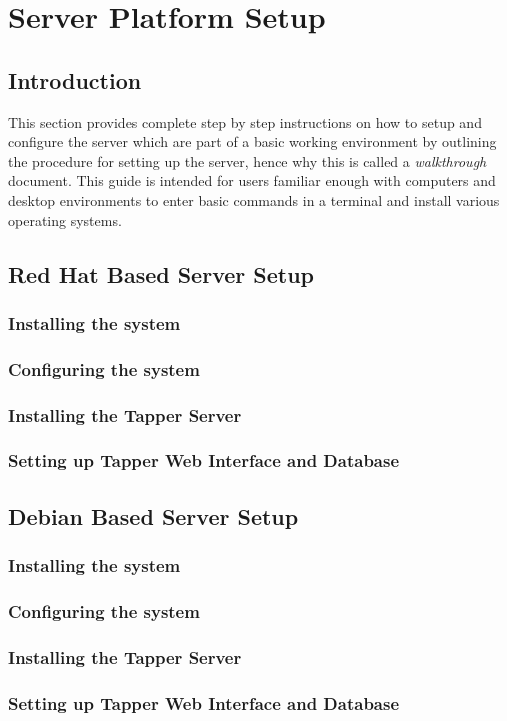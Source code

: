 \chapter{\cernvmreleasetesting Server Platform Setup}
\label{sct:serversetup}

\section{Introduction}
This section provides complete step by step instructions on how to setup and configure the \tapper server which are part of a basic working
\releasetesting environment by outlining the procedure for setting up the server, hence why this is called a \emph{walkthrough} document. 
This guide is intended for users familiar enough with computers and desktop environments to enter basic commands in a terminal and install 
various operating systems. 

\section{Red Hat Based Server Setup}
\subsection{Installing the system}
\subsection{Configuring the system}
\subsection{Installing the Tapper Server}
\subsection{Setting up Tapper Web Interface and Database}

\section{Debian Based Server Setup}
\subsection{Installing the system}
\subsection{Configuring the system}
\subsection{Installing the Tapper Server}
\subsection{Setting up Tapper Web Interface and Database}